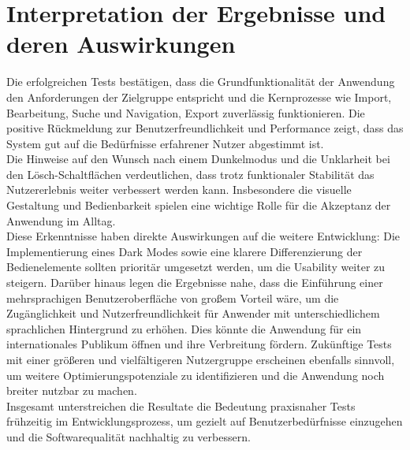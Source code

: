 \section{Interpretation der Ergebnisse und deren Auswirkungen}
Die erfolgreichen Tests bestätigen, dass die Grundfunktionalität der Anwendung den Anforderungen der Zielgruppe entspricht
und die Kernprozesse wie Import, Bearbeitung, Suche und Navigation, Export zuverlässig funktionieren. Die positive Rückmeldung zur
Benutzerfreundlichkeit und Performance zeigt, dass das System gut auf die Bedürfnisse erfahrener Nutzer abgestimmt ist.\\

\noindent Die Hinweise auf den Wunsch nach einem Dunkelmodus und die Unklarheit bei den Lösch-Schaltflächen verdeutlichen,
dass trotz funktionaler Stabilität das Nutzererlebnis weiter verbessert werden kann. Insbesondere die visuelle 
Gestaltung und Bedienbarkeit spielen eine wichtige Rolle für die Akzeptanz der Anwendung im Alltag.\\

\noindent Diese Erkenntnisse haben direkte Auswirkungen auf die weitere Entwicklung: Die Implementierung eines Dark Modes
sowie eine klarere Differenzierung der Bedienelemente sollten prioritär umgesetzt werden, um die Usability weiter 
zu steigern. Darüber hinaus legen die Ergebnisse nahe, dass die Einführung einer mehrsprachigen Benutzeroberfläche
von großem Vorteil wäre, um die Zugänglichkeit und Nutzerfreundlichkeit für Anwender mit unterschiedlichem sprachlichen
Hintergrund zu erhöhen. Dies könnte die Anwendung für ein internationales Publikum öffnen und ihre Verbreitung fördern.
Zukünftige Tests mit einer größeren und vielfältigeren Nutzergruppe erscheinen ebenfalls sinnvoll,
um weitere Optimierungspotenziale zu identifizieren und die Anwendung noch breiter nutzbar zu machen.\\

\noindent Insgesamt unterstreichen die Resultate die Bedeutung praxisnaher Tests frühzeitig im Entwicklungsprozess,
um gezielt auf Benutzerbedürfnisse einzugehen und die Softwarequalität nachhaltig zu verbessern.